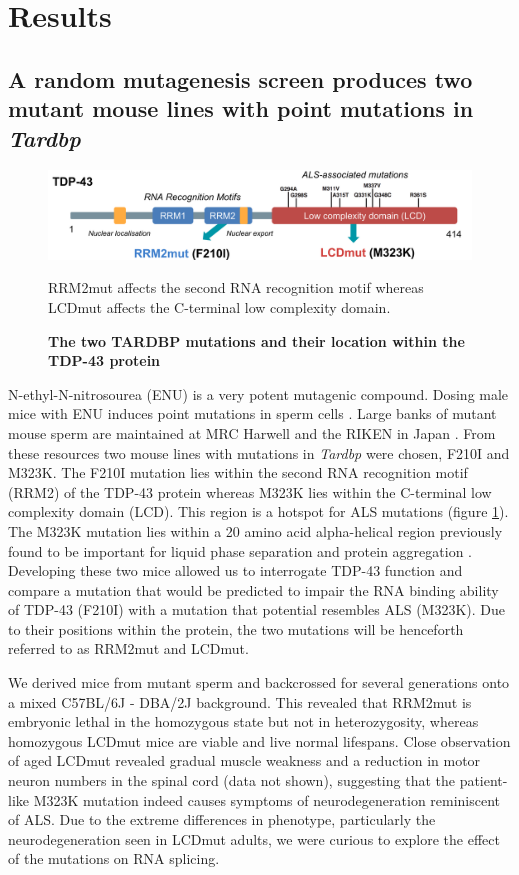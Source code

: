 \section{Results}

\subsection{A random mutagenesis screen produces two mutant mouse lines with point mutations in \textit{Tardbp}}

\begin{figure}[h!]
	\centering
	\includegraphics[width=\textwidth]{Figures/05_tdp_mice/TDP_structure_mutations.png}
	\caption{\textbf{The two TARDBP mutations and their location within the TDP-43 protein}}
	RRM2mut affects the second RNA recognition motif whereas LCDmut affects the C-terminal low complexity domain.
	\label{fig:tdp_structure}
\end{figure}

N-ethyl-N-nitrosourea (ENU) is a very potent mutagenic compound. Dosing male mice with ENU induces point mutations in sperm cells \citep{DeAngelis2000}. 
Large banks of mutant mouse sperm are maintained at MRC Harwell \citep{Acevedo2008} and the RIKEN in Japan \citep{Gondo2010}. 
From these resources two mouse lines with mutations in \textit{Tardbp} were chosen, F210I and M323K. 
The F210I mutation lies within the second RNA recognition motif (RRM2) of the TDP-43 protein whereas M323K lies within the C-terminal low complexity domain (LCD). 
This region is a hotspot for ALS mutations (figure \ref{fig:tdp_structure}). 
The M323K mutation lies within a 20 amino acid alpha-helical region previously found to be important for liquid phase separation and protein aggregation \citep{Conicella2016}. 
Developing these two mice allowed us to interrogate TDP-43 function and compare a mutation that would be predicted to impair the RNA binding ability of TDP-43 (F210I) with a mutation that potential resembles ALS (M323K). 
Due to their positions within the protein, the two mutations will be henceforth referred to as RRM2mut and LCDmut.

We derived mice from mutant sperm and backcrossed for several generations onto a mixed C57BL/6J - DBA/2J background.
This revealed that RRM2mut is embryonic lethal in the homozygous state but not in heterozygosity, whereas homozygous LCDmut mice are viable and live normal lifespans. Close observation of aged LCDmut revealed gradual muscle weakness and a reduction in motor neuron numbers in the spinal cord (data not shown), suggesting that the patient-like M323K mutation indeed causes symptoms of neurodegeneration reminiscent of ALS. 
Due to the extreme differences in phenotype, particularly the neurodegeneration seen in LCDmut adults, we were curious to explore the effect of the mutations on RNA splicing.

